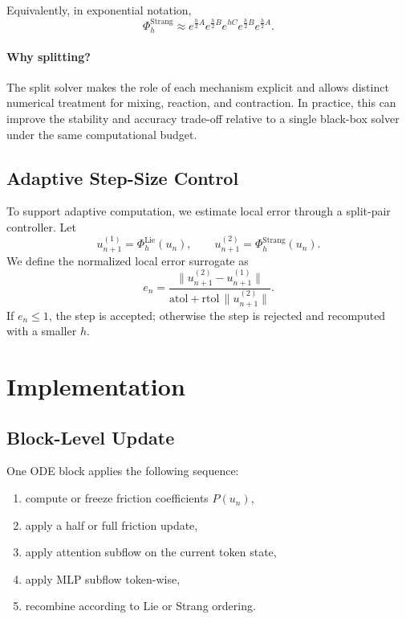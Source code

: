 \documentclass{article}
\newcommand{\Flow}{\Phi}
\newcommand{\Lie}{\mathrm{Lie}}
\newcommand{\Strang}{\mathrm{Strang}}
\begin{document}
Equivalently, in exponential notation,
\begin{equation}
    \Flow_h^{\Strang}
    \approx
    e^{\frac{h}{2}A}
    e^{\frac{h}{2}B}
    e^{hC}
    e^{\frac{h}{2}B}
    e^{\frac{h}{2}A}.
\end{equation}

\paragraph{Why splitting?}
The split solver makes the role of each mechanism explicit and allows distinct numerical treatment for mixing, reaction, and contraction. In practice, this can improve the stability and accuracy trade-off relative to a single black-box solver under the same computational budget.

\subsection{Adaptive Step-Size Control}

To support adaptive computation, we estimate local error through a split-pair controller. Let
\begin{equation}
    u_{n+1}^{(1)} = \Flow_h^{\Lie}(u_n),
    \qquad
    u_{n+1}^{(2)} = \Flow_h^{\Strang}(u_n).
\end{equation}
We define the normalized local error surrogate as
\begin{equation}
    e_n
    =
    \frac{\lVert u_{n+1}^{(2)} - u_{n+1}^{(1)} \rVert}
    {\mathrm{atol} + \mathrm{rtol}\,\lVert u_{n+1}^{(2)} \rVert}.
\end{equation}
If $e_n \le 1$, the step is accepted; otherwise the step is rejected and recomputed with a smaller $h$.

\section{Implementation}

\subsection{Block-Level Update}
One ODE block applies the following sequence:
\begin{enumerate}[leftmargin=1.5em]
    \item compute or freeze friction coefficients $P(u_n)$,
    \item apply a half or full friction update,
    \item apply attention subflow on the current token state,
    \item apply MLP subflow token-wise,
    \item recombine according to Lie or Strang ordering.
\end{enumerate}
\end{document}
